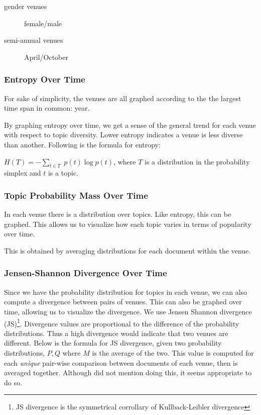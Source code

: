 	\begin{description}
		\item [gender venues] female/male
		\item [semi-annual venues] April/October
	\end{description}

\subsubsection{Entropy Over Time}
For sake of simplicity, the venues are all graphed according to the the largest time span in common: year.

By graphing entropy over time, we get a sense of the general trend for each venue with respect to topic diversity. Lower entropy indicates a venue is less diverse than another. Following is the formula for entropy:

\begin{center}
$H(T) = - \sum_{t \in T} \;  p(t) \log p(t)$, where $T$ is a distribution in the probability simplex and $t$ is a topic.
\end{center}

\subsubsection{Topic Probability Mass Over Time}
In each venue there is a distribution over topics. Like entropy, this can be graphed. This allows us to visualize how each topic varies in terms of popularity over time.

This is obtained by averaging distributions for each document within the venue. 

\subsubsection{Jensen-Shannon Divergence Over Time}
Since we have the probability distribution for topics in each venue, we can also compute a divergence between pairs of venues. This can also be graphed over time, allowing us to visualize the divergence. We use Jensen Shannon divergence (JS)\footnote{JS divergence is the symmetrical corrollary of Kullback-Leibler divergence}. Divergence values are proportional to the difference of the probability distributions. Thus a high divergence would indicate that two venues are different. Below is the formula for JS divergence, given two probability distributions, $P, Q$ where $M$ is the average of the two. This value is computed for each \textit{unique} pair-wise comparison between documents of each venue, then is averaged together. Although \cite{hall-jurafsky-manning:2008:EMNLP} did not mention doing this, it seems appropriate to do so.

